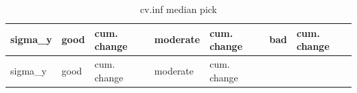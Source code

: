 \documentclass[
  letterpaper,
  DIV=11,
  numbers=noendperiod]{scrartcl}
\begin{document}
\begin{longtable}[]{@{}
  >{\raggedleft\arraybackslash}p{}
  >{\raggedleft\arraybackslash}p{}
  >{\raggedleft\arraybackslash}p{}
  >{\raggedleft\arraybackslash}p{}
  >{\raggedleft\arraybackslash}p{}
  >{\raggedleft\arraybackslash}p{}
  >{\raggedleft\arraybackslash}p{}@{}}
\caption{cv.inf median pick}\tabularnewline
\toprule\noalign{}
\begin{minipage}[b]{\linewidth}\raggedleft
sigma\_y
\end{minipage} & \begin{minipage}[b]{\linewidth}\raggedleft
good
\end{minipage} & \begin{minipage}[b]{\linewidth}\raggedleft
cum. change
\end{minipage} & \begin{minipage}[b]{\linewidth}\raggedleft
moderate
\end{minipage} & \begin{minipage}[b]{\linewidth}\raggedleft
cum. change
\end{minipage} & \begin{minipage}[b]{\linewidth}\raggedleft
bad
\end{minipage} & \begin{minipage}[b]{\linewidth}\raggedleft
cum. change
\end{minipage} \\
\midrule\noalign{}
\endfirsthead
\toprule\noalign{}
\begin{minipage}[b]{\linewidth}\raggedleft
sigma\_y
\end{minipage} & \begin{minipage}[b]{\linewidth}\raggedleft
good
\end{minipage} & \begin{minipage}[b]{\linewidth}\raggedleft
cum. change
\end{minipage} & \begin{minipage}[b]{\linewidth}\raggedleft
moderate
\end{minipage} & \begin{minipage}[b]{\linewidth}\raggedleft
cum. change
\end{minipage} & \begin{minipage}[b]{\linewidth}\raggedleft

\end{minipage}
\end{longtable}
\end{document}
